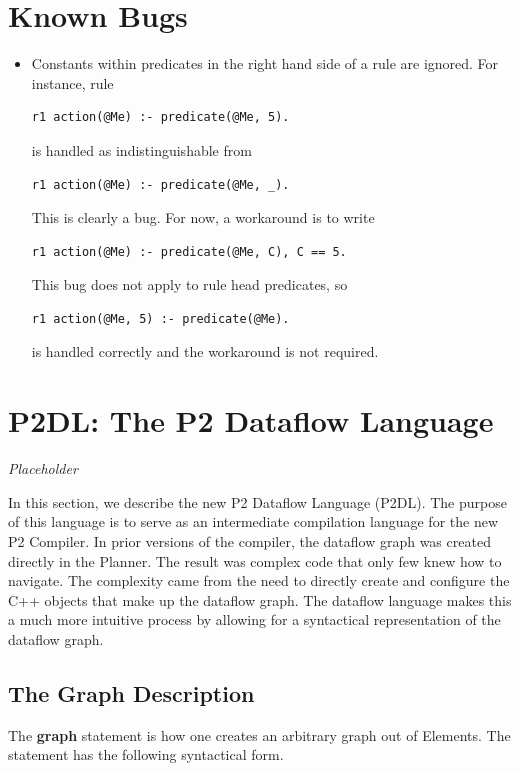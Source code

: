 \documentclass{article}
\begin{document}
\section{Known Bugs}

\begin{itemize}
\item Constants within predicates in the right hand side of a rule are
  ignored. For instance, rule 
\begin{lstlisting}
r1 action(@Me) :- predicate(@Me, 5).
\end{lstlisting}
is handled as indistinguishable from
\begin{lstlisting}
r1 action(@Me) :- predicate(@Me, _).
\end{lstlisting}
This is clearly a bug. For now, a workaround is to write
\begin{lstlisting}
r1 action(@Me) :- predicate(@Me, C), C == 5.
\end{lstlisting}
This bug does not apply to rule head predicates, so 
\begin{lstlisting}
r1 action(@Me, 5) :- predicate(@Me).
\end{lstlisting}
is handled correctly and the workaround is not required.
\end{itemize}



\section{P2DL: The P2 Dataflow Language}
\label{sec:p2dl}

\emph{Placeholder}

In this section, we describe the new P2 Dataflow Language (P2DL). The purpose
of this language is to serve as an intermediate compilation language for the
new P2 \ol Compiler. In prior versions of the \ol compiler, the dataflow
graph was created directly in the Planner. The result was complex code that only
few knew how to navigate. The complexity came from the need to directly create
and configure the C++ objects that make up the dataflow graph. The dataflow
language makes this a much more intuitive process by allowing for a syntactical 
representation of the dataflow graph.


\subsection{The Graph Description}

The {\bf graph} statement is how one creates an arbitrary graph out of
Elements. The statement has the following syntactical form.
\end{document}
